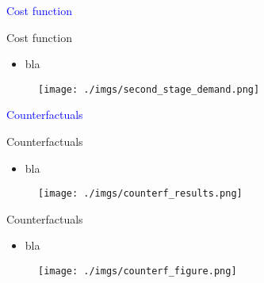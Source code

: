 \documentclass[notes,11pt, aspectratio=169]{beamer}
\begin{document}
\begin{frame}
    \textcolor{blue}{\huge{\centerline{Cost function}}}
\end{frame}

\begin{frame}{Cost function}
    \vspace{0.5cm}
      \begin{itemize}
        \item  bla
      \end{itemize}
      
        \begin{figure}[t*]
          \centering
    
          \texttt{[image: ./imgs/second\_stage\_demand.png]}
        \end{figure}
        
      \end{frame}

\begin{frame}
    \textcolor{blue}{\huge{\centerline{Counterfactuals}}}
\end{frame}

\begin{frame}{Counterfactuals}
    \vspace{0.5cm}
      \begin{itemize}
        \item  bla
      \end{itemize}
      
        \begin{figure}[t*]
          \centering
    
          \texttt{[image: ./imgs/counterf\_results.png]}
        \end{figure}
        
      \end{frame}

\begin{frame}{Counterfactuals}
    \vspace{0.5cm}
      \begin{itemize}
        \item  bla
      \end{itemize}
      
        \begin{figure}[t*]
          \centering
    
          \texttt{[image: ./imgs/counterf\_figure.png]}
        \end{figure}
        
      \end{frame}
\end{document}
